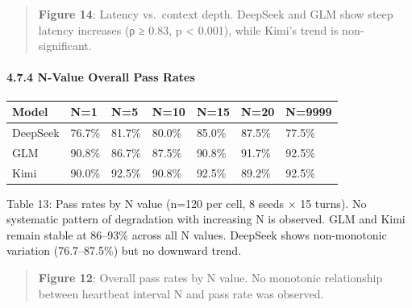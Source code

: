 \begin{quote}

\textbf{Figure 14}: Latency vs.~context depth. DeepSeek and GLM show steep latency increases (ρ ≥ 0.83, p \textless{} 0.001), while Kimi's trend is non-significant.

\end{quote}



\paragraph{4.7.4 N-Value Overall Pass Rates}\label{n-value-overall-pass-rates}



{\def\LTcaptype{none} %

\begin{longtable}[]{@{}lllllll@{}}

\toprule\noalign{}

Model & N=1 & N=5 & N=10 & N=15 & N=20 & N=9999 \\

\midrule\noalign{}

\endhead

\bottomrule\noalign{}

\endlastfoot

DeepSeek & 76.7\% & 81.7\% & 80.0\% & 85.0\% & 87.5\% & 77.5\% \\

GLM & 90.8\% & 86.7\% & 87.5\% & 90.8\% & 91.7\% & 92.5\% \\

Kimi & 90.0\% & 92.5\% & 90.8\% & 92.5\% & 89.2\% & 92.5\% \\

\end{longtable}

}



Table 13: Pass rates by N value (n=120 per cell, 8 seeds × 15 turns). No systematic pattern of degradation with increasing N is observed. GLM and Kimi remain stable at 86--93\% across all N values. DeepSeek shows non-monotonic variation (76.7--87.5\%) but no downward trend.



\begin{quote}

\textbf{Figure 12}: Overall pass rates by N value. No monotonic relationship between heartbeat interval N and pass rate was observed.

\end{quote}



